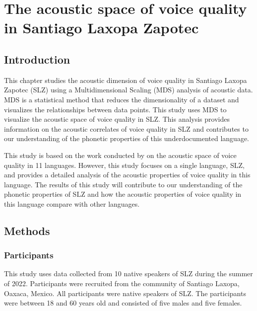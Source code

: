 \chapter{The acoustic space of voice quality in Santiago Laxopa Zapotec} \label{ch:acousticlandscape}

\section{Introduction} \label{sec:acousticlandscape:intro}

This chapter studies the acoustic dimension of voice quality in Santiago Laxopa Zapotec (SLZ) using a Multidimensional Scaling (MDS) analysis of acoustic data. MDS is a statistical method that reduces the dimensionality of a dataset and visualizes the relationships between data points. This study uses MDS to visualize the acoustic space of voice quality in SLZ. This analysis provides information on the acoustic correlates of voice quality in SLZ and contributes to our understanding of the phonetic properties of this underdocumented language.

This study is based on the work conducted by \citet{keatingCrosslanguageAcousticSpace2023} on the acoustic space of voice quality in 11 languages. However, this study focuses on a single language, SLZ, and provides a detailed analysis of the acoustic properties of voice quality in this language. The results of this study will contribute to our understanding of the phonetic properties of SLZ and how the acoustic properties of voice quality in this language compare with other languages.

\section{Methods} \label{sec:acousticlandscape:methods}
\subsection{Participants} \label{sec:acousticlandscape:participants}
This study uses data collected from 10 native speakers of SLZ during the summer of 2022. Participants were recruited from the community of Santiago Laxopa, Oaxaca, Mexico. All participants were native speakers of SLZ. The participants were between 18 and 60 years old and consisted of five males and five females.
